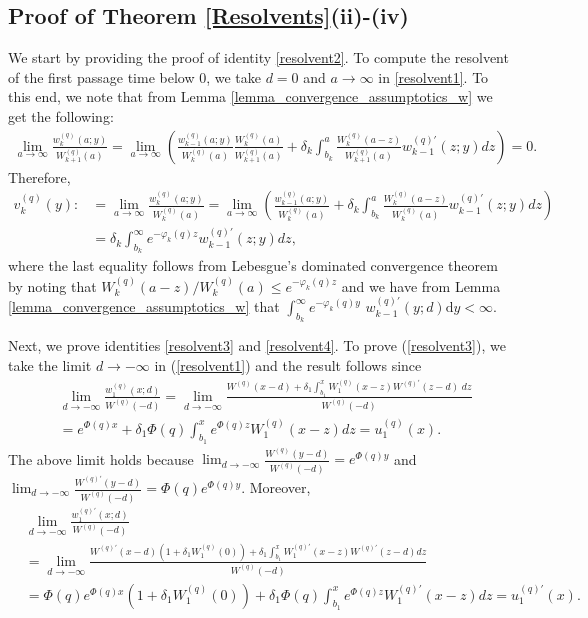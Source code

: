 \documentclass[12pt,reqno]{amsart}
\newcommand{\red}{\textcolor[rgb]{1.00,0.00,0.00}}
\newcommand{\blue}{\textcolor[rgb]{0.00,0.00,1.00}}
\theoremstyle{definition}
\theoremstyle{remark}
\newcommand{\md}{\mathrm{d}}
\begin{document}
\subsection{Proof of Theorem \ref{Resolvents}(ii)-(iv)} 
We start by providing the proof of identity \eqref{resolvent2}.
To compute the resolvent of the first passage time below $0$, we take $d=0$ and $a \to \infty$ in \eqref{resolvent1}. 
To this end, we note that from Lemma \ref{lemma_convergence_assumptotics_w} we get the following:
\begin{align*}
\lim_{a\to\infty}\frac{w_k^{(q)}(a;y)}{W_{k+1}^{(q)}(a)}=\lim_{a\to\infty}\left(\frac{w_{k-1}^{(q)}(a;y)}{W_k^{(q)}(a)}\frac{W_k^{(q)}(a)}{W_{k+1}^{(q)}(a)}+\delta_k\int_{b_k}^a
\frac{W_k^{(q)}(a-z)}{W_{k+1}^{(q)}(a)}w_{k-1}^{(q)\prime}(z;y)dz\right)=0.
\end{align*}
Therefore,
\begin{align}\label{function_v}\nonumber
v_k^{(q)}(y):&=\lim_{a\to\infty}\frac{w_k^{(q)}(a;y)}{W_{k}^{(q)}(a)}=\lim_{a\to\infty}\left(\frac{w_{k-1}^{(q)}(a;y)}{W_k^{(q)}(a)}+
\delta_k\int_{b_k}^a\frac{W_k^{(q)}(a-z)}{W_{k}^{(q)}(a)}w_{k-1}^{(q)\prime}(z;y)dz\right)\\&=\delta_k\int_{b_k}^{\infty} 
e^{-\varphi_k(q)z}w_{k-1}^{(q)\prime}(z;y)dz,
\end{align} 
where the last equality follows from Lebesgue's dominated convergence theorem by noting that 
$W_k^{(q)}(a-z) / W_{k}^{(q)}(a) \leq e^{-\varphi_k(q) z} $ and we have from Lemma \ref{lemma_convergence_assumptotics_w} 
that $\int^{\infty}_{b_{k}} e^{-\varphi_k(q)y}$ $w_{k-1}^{(q)\prime}(y;d)\md y < \infty$.

	Next, we prove identities \eqref{resolvent3} and \eqref{resolvent4}.
	To prove (\ref{resolvent3}), we take the limit $d \rightarrow -\infty $ in (\ref{resolvent1}) and the result follows since
	\begin{align*}
&\lim_{d\to-\infty}\frac{w_{1}^{(q)}(x;d)}{W^{(q)}(-d)} =\lim_{d\to-\infty}\frac{
W^{(q)}(x-d)+\delta_1\int_{b_1}^x W_1^{(q)}(x-z)W^{(q)\prime}(z-d)\;dz }{W^{(q)}(-d)}\\
& =e^{\Phi(q)x}+ \delta_1 \Phi(q)\int_{b_1}^x e^{\Phi(q)z} W_1^{(q)}(x-z)dz=u^{(q)}_1(x). 
\end{align*}
The above limit holds because  $\lim_{d\to -\infty} \frac{W^{(q)}(y-d)}{W^{(q)}(-d)}=e^{\Phi(q)y}$ and
$\lim_{d\to-\infty}  \frac{W^{(q)\prime}(y-d)}{W^{(q)}(-d)}=\Phi(q)e^{\Phi(q)y} $. Moreover,
\begin{align*}
&\lim_{d\to-\infty}\frac{ w_{1}^{(q)\prime}(x;d)}{W^{(q)}(-d)} \\&=\lim_{d\to-\infty}\frac{
W^{(q)\prime}(x-d)\left(1+\delta_1 W_1^{(q)}(0)\right)+\delta_1\int_{b_1}^x W_1^{(q)\prime}(x-z)W^{(q)\prime}(z-d)dz}{W^{(q)}(-d)}\\
& =\Phi(q)e^{\Phi(q)x}\left(1+\delta_1 W_1^{(q)}(0)\right)+ \delta_1 \Phi(q)\int_{b_1}^x e^{\Phi(q)z} W_1^{(q)\prime}(x-z)dz=u^{(q)\prime}_1(x). 
\end{align*}
\end{document}
